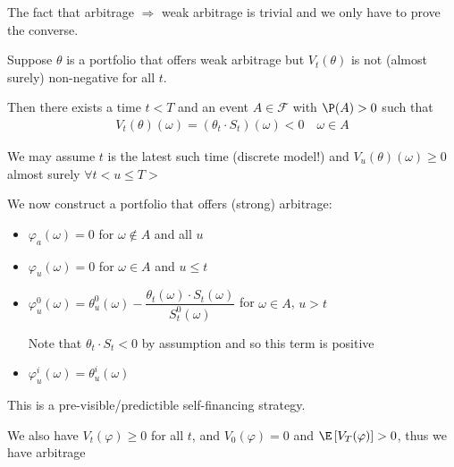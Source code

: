 \begin{prf}[]{}
  The fact that arbitrage $\Rightarrow$ weak arbitrage is trivial and we only have to prove the converse.\par
  \noindent Suppose $\theta$ is a portfolio that offers weak arbitrage but $V_t(\theta)$ is not (almost surely) non-negative for all $t$.\par
  \noindent Then there exists a time $t<T$ and an event $A\in\mathcal{F}$ with $\P(A)>0$ such that
  \begin{equation*}
    \begin{gathered}
      V_t(\theta)(\omega) = (\theta_t\cdot S_t)(\omega)<0\quad \omega\in A
    \end{gathered}
  \end{equation*}\par
  \noindent We may assume $t$ is the latest such time (discrete model!) and $V_u(\theta)(\omega)\geq0$ almost surely $\forall t<u\leq T>$\par
  \noindent We now construct a portfolio that offers (strong) arbitrage:
  \begin{itemize}
    \item $\varphi_a(\omega) = 0$ for $\omega\not\in A$ and all $u$
    \item $\varphi_u(\omega) = 0$ for $\omega \in A$ and $u\leq t$
    \item $\varphi_u^0(\omega) = \theta_u^0(\omega)-\dfrac{\theta_t(\omega)\cdot S_t(\omega)}{S_t^0(\omega)}$ for $\omega\in A$, $u>t$\par
      \noindent Note that $\theta_t\cdot S_t<0$ by assumption and so this term is positive
      \par\bigskip
    \item $\varphi_u^i(\omega) = \theta_u^i(\omega)$
  \end{itemize}
  \par\bigskip
  \noindent This is a pre-visible/predictible self-financing strategy.\par
  \noindent We also have $V_t(\varphi)\geq0$ for all $t$, and $V_0(\varphi)=0$ and $\E\left[V_T(\varphi)\right]>0$, thus we have arbitrage
\end{prf}
